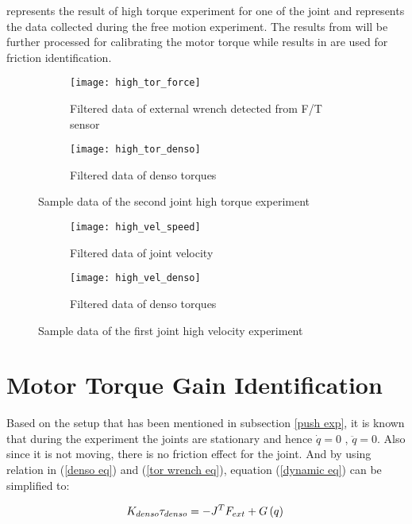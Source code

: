  represents the result of high torque experiment for one of the joint and  represents the data collected during the free motion experiment. The results from  will be further processed for calibrating the motor torque while results in  are used for friction identification.

\begin{figure}[H]
  \begin{subfigure}[t]{0.5\textwidth}
    \centering
    \texttt{[image: high\_tor\_force]} 
    \caption{Filtered data of external wrench detected from F/T sensor}
  \end{subfigure}
  \begin{subfigure}[t]{0.5\textwidth}
    \centering
    \texttt{[image: high\_tor\_denso]}
    \caption{Filtered data of denso torques}
  \end{subfigure}
  \caption{Sample data of the second joint high torque experiment}
  \label{fig: push result}
\end{figure}

\begin{figure}[H]
  \begin{subfigure}[t]{0.5\textwidth}
    \centering
    \texttt{[image: high\_vel\_speed]} 
    \caption{Filtered data of joint velocity}
  \end{subfigure}
  \begin{subfigure}[t]{0.5\textwidth}
    \centering
    \texttt{[image: high\_vel\_denso]}
    \caption{Filtered data of denso torques}
  \end{subfigure}
  \caption{Sample data of the first joint high velocity experiment}
  \label{fig: fric result}
\end{figure}


\section{Motor Torque Gain Identification}
Based on the setup that has been mentioned in subsection \ref{push exp}, it is known that during the experiment the joints are stationary and hence $\dot{q} = 0$ , $\ddot{q} = 0$. Also since it is not moving, there is no friction effect for the joint. And by using relation in (\ref{denso eq}) and (\ref{tor wrench eq}), equation (\ref{dynamic eq}) can be simplified to: 

\begin{equation}
  K_{denso} \tau_{denso} = - J^{T} F_{ext} + G\left(q \right) \\
\end{equation}

